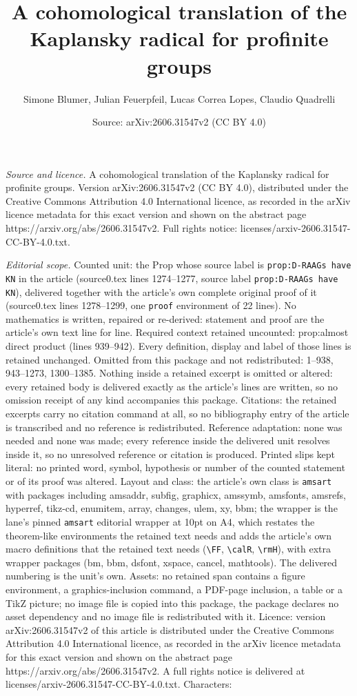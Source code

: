 \documentclass[10pt,a4paper]{amsart}
\title[A cohomological translation of the Kaplansky radical for pro]{A cohomological translation of the Kaplansky radical for profinite groups}
\author{Simone Blumer, Julian Feuerpfeil, Lucas Correa Lopes, Claudio Quadrelli}
\date{Source: arXiv:2606.31547v2 (CC BY 4.0)}
\begin{document}
\maketitle

\noindent\emph{Source and licence.} A cohomological translation of the Kaplansky radical for profinite groups. Version arXiv:2606.31547v2 (CC BY 4.0), distributed under the Creative Commons Attribution 4.0 International licence, as recorded in the arXiv licence metadata for this exact version and shown on the abstract page https://arxiv.org/abs/2606.31547v2. Full rights notice: licenses/arxiv-2606.31547-CC-BY-4.0.txt.\par\smallskip

\noindent\textit{Editorial scope.} Counted unit: the Prop whose source label is \texttt{prop:D-RAAGs have KN} in the article (source0.tex lines 1274--1277, source label \texttt{prop:D-RAAGs have KN}), delivered together with the article's own complete original proof of it (source0.tex lines 1278--1299, one \texttt{proof} environment of 22 lines). No mathematics is written, repaired or re-derived: statement and proof are the article's own text line for line. Required context retained uncounted: prop:almost direct product (lines 939--942). Every definition, display and label of those lines is retained unchanged. Omitted from this package and not redistributed: 1--938, 943--1273, 1300--1385. Nothing inside a retained excerpt is omitted or altered: every retained body is delivered exactly as the article's lines are written, so no omission receipt of any kind accompanies this package. Citations: the retained excerpts carry no citation command at all, so no bibliography entry of the article is transcribed and no reference is redistributed. Reference adaptation: none was needed and none was made; every reference inside the delivered unit resolves inside it, so no unresolved reference or citation is produced. Printed slips kept literal: no printed word, symbol, hypothesis or number of the counted statement or of its proof was altered. Layout and class: the article's own class is \texttt{amsart} with packages including amsaddr, subfig, graphicx, amssymb, amsfonts, amsrefs, hyperref, tikz-cd, enumitem, array, changes, ulem, xy, bbm; the wrapper is the lane's pinned \texttt{amsart} editorial wrapper at 10pt on A4, which restates the theorem-like environments the retained text needs and adds the article's own macro definitions that the retained text needs (\texttt{\textbackslash FF}, \texttt{\textbackslash calR}, \texttt{\textbackslash rmH}), with extra wrapper packages (bm, bbm, dsfont, xspace, cancel, mathtools). The delivered numbering is the unit's own. Assets: no retained span contains a figure environment, a graphics-inclusion command, a PDF-page inclusion, a table or a TikZ picture; no image file is copied into this package, the package declares no asset dependency and no image file is redistributed with it. Licence: version arXiv:2606.31547v2 of this article is distributed under the Creative Commons Attribution 4.0 International licence, as recorded in the arXiv licence metadata for this exact version and shown on the abstract page https://arxiv.org/abs/2606.31547v2. A full rights notice is delivered at licenses/arxiv-2606.31547-CC-BY-4.0.txt. Characters: 
\end{document}
